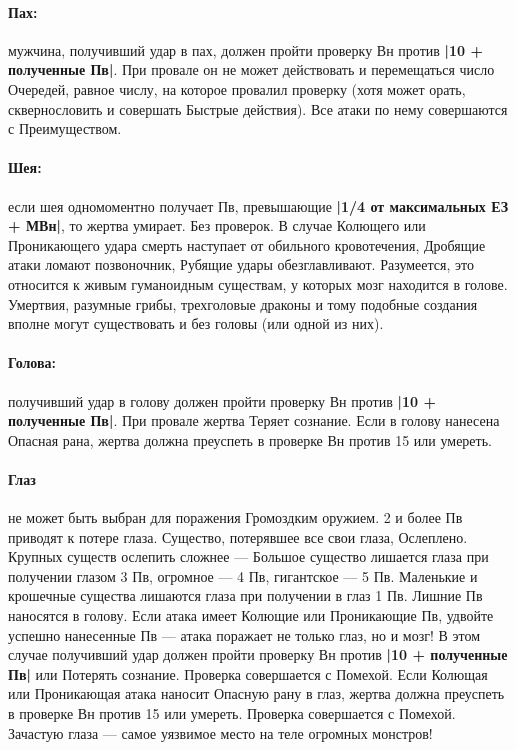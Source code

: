 \paragraph{Пах:} мужчина, получивший удар в пах, должен пройти проверку Вн против \textbf{|10 + полученные Пв|}. При провале он не может действовать и перемещаться число Очередей, равное числу, на которое провалил проверку (хотя может орать, сквернословить и совершать Быстрые действия). Все атаки по нему совершаются с Преимуществом.
\paragraph{Шея:} если шея одномоментно получает Пв, превышающие \textbf{|1/4 от максимальных ЕЗ + МВн|}, то жертва умирает. Без проверок. В случае Колющего или Проникающего удара смерть наступает от обильного кровотечения, Дробящие атаки ломают позвоночник, Рубящие удары обезглавливают.
\newline
Разумеется, это относится к живым гуманоидным существам, у которых мозг находится в голове. Умертвия, разумные грибы, трехголовые драконы и тому подобные создания вполне могут существовать и без головы (или одной из них).
\paragraph{Голова:} получивший удар в голову должен пройти проверку Вн против \textbf{|10 + полученные Пв|}. При провале жертва Теряет сознание. Если в голову нанесена Опасная рана, жертва должна преуспеть в проверке Вн против 15 или умереть.
\paragraph{Глаз} не может быть выбран для поражения Громоздким оружием. 2 и более Пв приводят к потере глаза. Существо, потерявшее все свои глаза, Ослеплено. Крупных существ ослепить сложнее — Большое существо лишается глаза при получении глазом 3 Пв, огромное — 4 Пв, гигантское — 5 Пв. Маленькие и крошечные существа лишаются глаза при получении в глаз 1 Пв. Лишние Пв наносятся в голову.
\newline
Если атака имеет Колющие или Проникающие Пв, удвойте успешно нанесенные Пв — атака поражает не только глаз, но и мозг! В этом случае получивший удар должен пройти проверку Вн против \textbf{|10 + полученные Пв|} или Потерять сознание. Проверка совершается с Помехой.
\newline
Если Колющая или Проникающая атака наносит Опасную рану в глаз, жертва должна преуспеть в проверке Вн против 15 или умереть. Проверка совершается с Помехой.
\newline
Зачастую глаза — самое уязвимое место на теле огромных монстров!